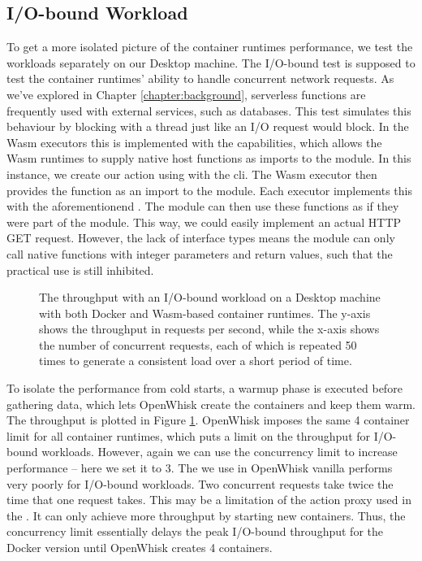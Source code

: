 \subsection{I/O-bound Workload}

To get a more isolated picture of the container runtimes performance, we test the workloads separately on our Desktop machine. The I/O-bound test is supposed to test the container runtimes' ability to handle concurrent network requests. As we've explored in Chapter \ref{chapter:background}, serverless functions are frequently used with external services, such as databases. This test simulates this behaviour by blocking with a thread  just like an I/O request would block. In the Wasm executors this is implemented with the capabilities, which allows the Wasm runtimes to supply native host functions as imports to the module. In this instance, we create our action using  with the  cli. The Wasm executor then provides the  function as an import to the module. Each executor implements this with the aforementionend . The module can then use these functions as if they were part of the module. This way, we could easily implement an actual HTTP GET request. However, the lack of interface types means the module can only call native functions with integer parameters and return values, such that the practical use is still inhibited.

\begin{figure}
    \begin{center}
        
    \end{center}
    \caption{The throughput with an I/O-bound workload on a Desktop machine with both Docker and Wasm-based container runtimes. The y-axis shows the throughput in requests per second, while the x-axis shows the number of concurrent requests, each of which is repeated 50 times to generate a consistent load over a short period of time.}
    \label{fig:pc-load-block}
\end{figure}

To isolate the performance from cold starts, a warmup phase is executed before gathering data, which lets OpenWhisk create the containers and keep them warm. The throughput is plotted in Figure \ref{fig:pc-load-block}. OpenWhisk imposes the same 4 container limit for all container runtimes, which puts a limit on the throughput for I/O-bound workloads. However, again we can use the concurrency limit to increase performance -- here we set it to 3. The  we use in OpenWhisk vanilla performs very poorly for I/O-bound workloads. Two concurrent requests take twice the time that one request takes. This may be a limitation of the action proxy used in the .
It can only achieve more throughput by starting new containers. Thus, the concurrency limit essentially delays the peak I/O-bound throughput for the Docker version until OpenWhisk creates 4 containers.

